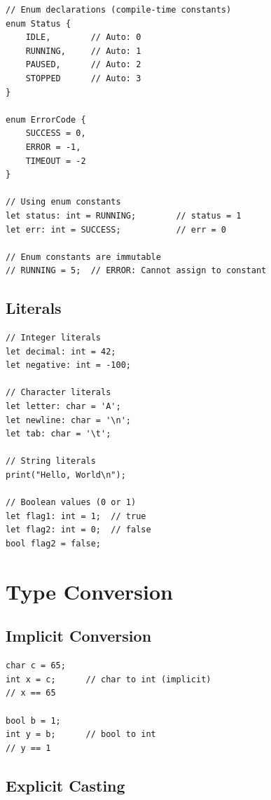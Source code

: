 \documentclass[12pt,a4paper,oneside]{book}
\begin{document}
\begin{lstlisting}[style=algo, caption={Compile-Time Constants with Enums}]
// Enum declarations (compile-time constants)
enum Status {
    IDLE,        // Auto: 0
    RUNNING,     // Auto: 1
    PAUSED,      // Auto: 2
    STOPPED      // Auto: 3
}

enum ErrorCode {
    SUCCESS = 0,
    ERROR = -1,
    TIMEOUT = -2
}

// Using enum constants
let status: int = RUNNING;        // status = 1
let err: int = SUCCESS;           // err = 0

// Enum constants are immutable
// RUNNING = 5;  // ERROR: Cannot assign to constant
\end{lstlisting}

\subsection{Literals}

\begin{lstlisting}[style=algo, caption={Literal Values}]
// Integer literals  
let decimal: int = 42;
let negative: int = -100;

// Character literals
let letter: char = 'A';
let newline: char = '\n';
let tab: char = '\t';

// String literals
print("Hello, World\n");

// Boolean values (0 or 1)
let flag1: int = 1;  // true
let flag2: int = 0;  // false
bool flag2 = false;
\end{lstlisting}

\section{Type Conversion}

\subsection{Implicit Conversion}

\begin{lstlisting}[style=algo]
char c = 65;
int x = c;      // char to int (implicit)
// x == 65

bool b = 1;
int y = b;      // bool to int
// y == 1
\end{lstlisting}

\subsection{Explicit Casting}
\end{document}
